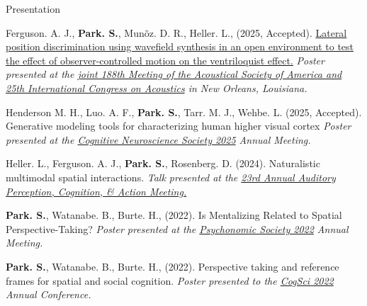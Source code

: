 \documentclass{resume} %
\begin{document}
\begin{rSection}{Presentation}
	\setlength{\hangingindent}{1.27cm}
	
	\begin{hangingpar}
		
		Ferguson. A. J., \textbf{Park. S.}, Mun\~oz. D. R., Heller. L., (2025, Accepted). \href{}{Lateral position discrimination using wavefield synthesis in an open environment to test the effect of observer-controlled motion on the ventriloquist effect.}
		\em{Poster presented at the
			\href{}{joint 188th Meeting of the Acoustical Society of America and 25th International Congress on Acoustics} in New Orleans, Louisiana.}
		
	\end{hangingpar}
	
	\begin{hangingpar}
		
		Henderson M. H., Luo. A. F., \textbf{Park. S.}, Tarr. M. J., Wehbe. L. (2025, Accepted). 
		Generative modeling tools for characterizing human higher visual cortex
		\em{Poster presented at the
			\href{https://www.cogneurosociety.org/poster/?id=6325}{Cognitive Neuroscience Society
				 2025} Annual Meeting.}
		
	\end{hangingpar}
	
	\begin{hangingpar}
		
		Heller. L., Ferguson. A. J., \textbf{Park. S.}, Rosenberg. D. (2024). 
		Naturalistic multimodal spatial interactions.
		\em{Talk presented at the
			\href{https://apcsociety.org/APCAM%202024%20Program.pdf#page=21.10}{23rd Annual Auditory Perception, Cognition, \& Action Meeting.}}
		
	\end{hangingpar}
	
	\begin{hangingpar}
		
		\textbf{Park. S.}, Watanabe. B., Burte. H., (2022). 
		Is Mentalizing Related to Spatial Perspective-Taking? 
		\em{Poster presented at the
			\href{https://www.psychonomic.org/page/2022annualmeeting}{Psychonomic
				Society 2022} Annual Meeting.}
		
	\end{hangingpar}
	
	\begin{hangingpar}
		
		\textbf{Park. S.}, Watanabe. B., Burte. H., (2022). 
		Perspective taking and reference frames for spatial and social 
		cognition. 
		\em{Poster presented to the
			\href{https://cognitivesciencesociety.org/cogsci-2022/}{CogSci 
				2022} Annual Conference.}
		

\end{hangingpar}
\end{rSection}
\end{document}
